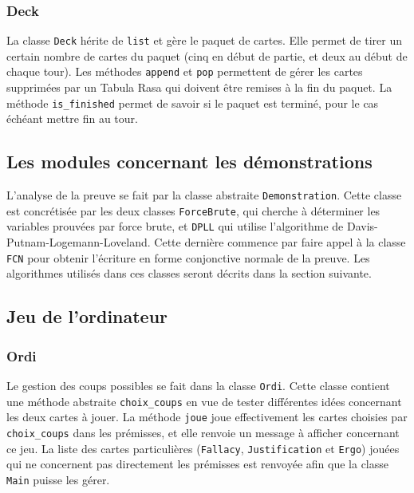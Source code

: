 \documentclass[12pt, a4paper]{article}
\begin{document}
\subsubsection{Deck}

La classe \texttt{Deck} hérite de \texttt{list} et gère le paquet de cartes. Elle permet de tirer un certain nombre de cartes du paquet (cinq en début de partie, et deux au début de chaque tour). Les méthodes \texttt{append} et \texttt{pop} permettent de gérer les cartes supprimées par un Tabula Rasa qui doivent être remises à la fin du paquet. La méthode \texttt{is\_finished} permet de savoir si le paquet est terminé, pour le cas échéant mettre fin au tour.

\subsection{Les modules concernant les démonstrations}

L'analyse de la preuve se fait par la classe abstraite \texttt{Demonstration}. Cette classe est concrétisée par les deux classes \texttt{ForceBrute}, qui cherche à déterminer les \og variables prouvées \fg par force brute, et \texttt{DPLL} qui utilise l'algorithme de Davis-Putnam-Logemann-Loveland. Cette dernière commence par faire appel à la classe \texttt{FCN} pour obtenir l'écriture en forme conjonctive normale de la preuve. Les algorithmes utilisés dans ces classes seront décrits dans la section suivante.

\subsection{Jeu de l'ordinateur}

\subsubsection{Ordi}

Le gestion des coups possibles se fait dans la classe \texttt{Ordi}. Cette classe contient une méthode abstraite \texttt{choix\_coups} en vue de tester différentes idées concernant les deux cartes à jouer. La méthode \texttt{joue} joue effectivement les cartes choisies par \texttt{choix\_coups} dans les prémisses, et elle renvoie un message à afficher concernant ce jeu. La liste des cartes particulières (\texttt{Fallacy}, \texttt{Justification} et \texttt{Ergo}) jouées qui ne concernent pas directement les prémisses est renvoyée afin que la classe \texttt{Main} puisse les gérer.
\end{document}

